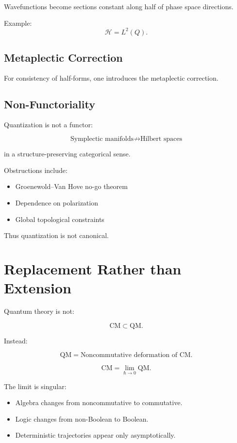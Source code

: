 \documentclass[11pt,a4paper]{article}
\begin{document}
Wavefunctions become sections constant along half of phase space directions.

Example:
\[
\mathcal H = L^2(Q).
\]

\subsection{Metaplectic Correction}

For consistency of half-forms, one introduces the metaplectic correction.

\subsection{Non-Functoriality}

Quantization is not a functor:

\[
\text{Symplectic manifolds}
\not\longrightarrow
\text{Hilbert spaces}
\]

in a structure-preserving categorical sense.

Obstructions include:

\begin{itemize}
\item Groenewold–Van Hove no-go theorem
\item Dependence on polarization
\item Global topological constraints
\end{itemize}

Thus quantization is not canonical.

\section{Replacement Rather than Extension}

Quantum theory is not:

\[
\text{CM} \subset \text{QM}.
\]

Instead:

\[
\text{QM} = \text{Noncommutative deformation of CM}.
\]

\[
\text{CM} = \lim_{\hbar\to0} \text{QM}.
\]

The limit is singular:

\begin{itemize}
\item Algebra changes from noncommutative to commutative.
\item Logic changes from non-Boolean to Boolean.
\item Deterministic trajectories appear only asymptotically.
\end{itemize}
\end{document}
